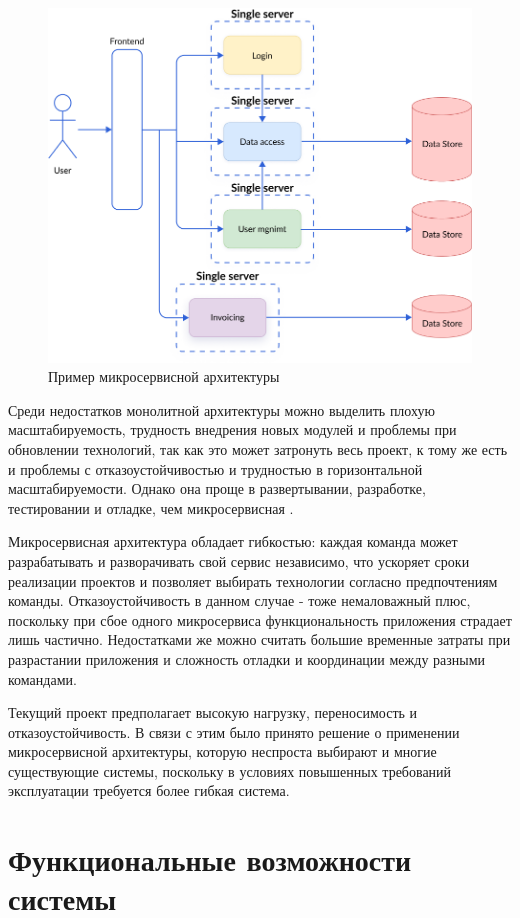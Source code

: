 \begin{figure}
  \centering
  \includegraphics[width=.9\textwidth]{graphics/img/micro.png}
  \caption{Пример микросервисной архитектуры}
  \label{fig:micro}
\end{figure}

Среди недостатков монолитной архитектуры можно выделить плохую масштабируемость, трудность внедрения новых модулей и проблемы при обновлении технологий, так как это может затронуть весь проект, к тому же есть и проблемы с отказоустойчивостью и трудностью в горизонтальной масштабируемости. Однако она проще в развертывании, разработке, тестировании и отладке, чем микросервисная \cite{arch:monovsmicro}. 

Микросервисная архитектура обладает гибкостью: каждая команда может разрабатывать и разворачивать свой сервис независимо, что ускоряет сроки реализации проектов и позволяет выбирать технологии согласно предпочтениям команды. Отказоустойчивость в данном случае - тоже немаловажный плюс, поскольку при сбое одного микросервиса функциональность приложения страдает лишь частично. Недостатками же можно считать большие временные затраты при разрастании приложения и сложность отладки и координации между разными командами.

Текущий проект предполагает высокую нагрузку, переносимость и отказоустойчивость. В связи с этим было принято решение о применении микросервисной архитектуры, которую неспроста выбирают и многие существующие системы, поскольку в условиях повышенных требований эксплуатации требуется более гибкая система.

\section{Функциональные возможности системы}

